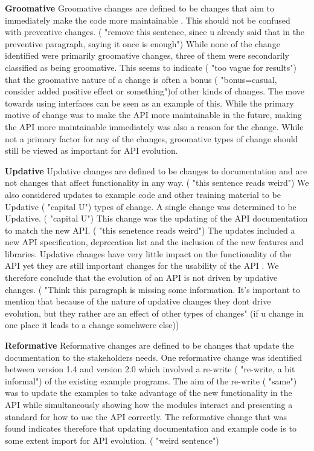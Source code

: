 \documentclass{sig-alternate}
\begin{document}
\smallskip \noindent
\textbf{Groomative  }
Groomative changes are defined to be changes that aim to immediately make the code more maintainable . This should not be confused with preventive changes. ( "remove this sentence, since u already said that in the preventive paragraph, saying it once is enough")
While none of the change identified were primarily groomative changes, three of them were secondarily classified as being groomative. This seems to indicate ( "too vague for results") that the groomative nature of a change is often a bonus ( "bonus=casual, consider added positive effect or something")of other kinds of changes. The move towards using interfaces can be seen as an example of this. While the primary motive of change was to make the API more maintainable in the future, making the API more maintainable immediately was also a reason for the change.
While not a primary factor for any of the changes, groomative types of change should still be viewed as important for API evolution.

\smallskip \noindent
\textbf{Updative  }
Updative changes are defined to be changes to documentation and are not changes that affect functionality in any way. ( "this sentence reads weird") We also considered updates to example code and other training material to be Updative ( "capital U") types of change.
A single change was determined to be Updative. ( "capital U")  This change was the updating of the API documentation to match the new API. ( "this senetence reads weird") The updates included a new API specification, deprecation list and the inclusion of the new features and libraries.
Updative changes have very little impact on the functionality of the API yet they are still important changes for the usability of the API \cite{shi2011empirical}. We therefore conclude that the evolution of an API is not driven by updative changes. ( "Think this paragraph is missing some information. It's important to mention that because of the nature of updative changes they dont drive evolution, but they rather are an effect of other types of changes" (if u change in one place it leads to a change somehwere else))

\smallskip \noindent
\textbf{Reformative  }
Reformative changes are defined to be changes that update the documentation to the stakeholders needs.
One reformative change was identified between version 1.4 and version 2.0 which involved a re-write ( "re-write, a bit informal") of the existing example programs. The aim of the re-write ( "same") was to update the examples to take advantage of the new functionality in the API while simultaneously showing how the modules interact and presenting a standard for how to use the API correctly.
The reformative change that was found indicates therefore that updating documentation and example code is to some extent import for API evolution. ( "weird sentence")
\end{document}
